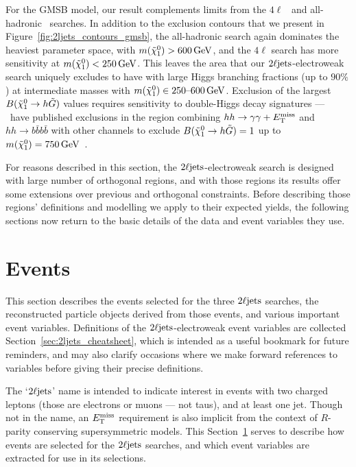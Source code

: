 For the GMSB model, our result complements limits from the
$4\ell$~\cite{SUSY-2018-02} and
all-hadronic~\cite{SUSY-2018-41} searches.
In addition to the exclusion contours that we present in
Figure~\ref{fig:2ljets_contours_gmsb}, the all-hadronic search again dominates
the heaviest parameter space, with $m(\neutralino_1) > 600\,\eV[G]$,
and the $4\ell$ search has more sensitivity at
$m(\neutralino_1) < 250\,\eV[G]$.
This leaves the area that our $\twoljets$-electroweak search uniquely excludes
to have with large Higgs branching fractions (up to $90\%$) at intermediate
masses with $m(\neutralino_1) \in 250\textrm{--}600\,\eV[G]$.
Exclusion of the largest $B(\neutralino_1 \to h \tilde{G})$ values
requires sensitivity to double-Higgs decay signatures --- \cms\ have published
exclusions in the region combining $hh\to \gamma\gamma+\met$ and
$hh\to b\bar bb\bar b$ with other channels to exclude
$B(\neutralino_1 \to h \tilde{G}) = 1$ up to
$m(\neutralino_1) = 750\,\eV[G]$~\cite{
cms_susy_2018_partial_run2_combination,
CMS-SUS-16-045,
CMS-SUS-16-044
}.

For reasons described in this section, the $\twoljets$-electroweak search is
designed with large number of orthogonal regions, and with those regions its
results offer some extensions over previous and orthogonal constraints.
Before describing those regions' definitions and modelling we apply to their
expected yields, the following sections now return to the basic details of the
data and event variables they use.

\section{Events}
\label{sec:2ljets_events}
This section describes the events selected for the three $\twoljets$ searches,
the reconstructed particle objects derived from those events, and various
important event variables.
Definitions of the $\twoljets$-electroweak event variables are collected
Section~\ref{sec:2ljets_cheatsheet}, which is intended as a useful bookmark
for future reminders, and may also clarify occasions where we make forward
references to variables before giving their precise definitions.

The `$\twoljets$' name is intended to indicate interest in events with two
charged leptons (those are electrons or muons --- not taus), and at least one
jet.
Though not in the name, an $\met$ requirement is also implicit from the context
of $R$-parity conserving supersymmetric models.
This Section~\ref{sec:2ljets_events} serves to describe how events are selected
for the $\twoljets$ searches, and which event variables are extracted for use
in its selections.


